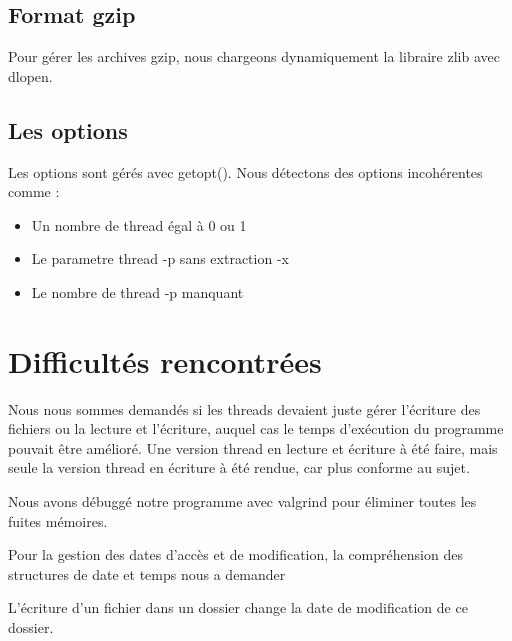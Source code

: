 \documentclass[a4paper,11pt, oneside]{book}
\begin{document}
{\let\clearpage\relax\section{ Format gzip}}

\par{Pour gérer les archives gzip, nous chargeons dynamiquement la libraire zlib avec dlopen.}\newline



{\let\clearpage\relax\section{ Les options}}
\par{Les options sont gérés avec getopt(). Nous détectons des options incohérentes comme :}
	\begin{itemize}
    \item{Un nombre de thread égal à 0 ou 1}
    \item{Le parametre thread -p sans extraction -x }
    \item{Le nombre de thread -p manquant }


	\end{itemize}

\newpage
{\let\clearpage\relax\chapter{Difficultés rencontrées}}

\par{Nous nous sommes demandés si les threads devaient juste gérer l’écriture des fichiers ou la lecture et l'écriture, auquel cas le temps d'exécution du programme pouvait être amélioré. Une version thread en lecture et écriture à été faire, mais seule la version thread en écriture à été rendue, car plus conforme au sujet. }

\par{Nous avons débuggé notre programme avec valgrind pour éliminer toutes les fuites mémoires.}

\par{Pour la gestion des dates d’accès et de modification, la compréhension des structures de date et temps nous a demander}

\par{L'écriture d'un fichier dans un dossier change la date de modification de ce dossier.}

	

	\newpage
	

	

	\clearpage
\end{document}
